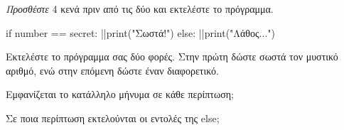 \documentclass[a4paper,11pt,oneside]{book}
\begin{document}
\begin{step}
\emph{Προσθέστε} 4 κενά πριν από τις δύο  και εκτελέστε το πρόγραμμα.

\begin{pyplain}
if number == secret:
|\pyhighlight{\vphantom{λρ}    }|print("Σωστά!")
else:
|\pyhighlight{\vphantom{λρ}    }|print("Λάθος...")
\end{pyplain}

Εκτελέστε το πρόγραμμα σας δύο φορές. Στην πρώτη δώστε σωστά τον μυστικό αριθμό, ενώ στην επόμενη δώστε έναν διαφορετικό.


Εμφανίζεται το κατάλληλο μήνυμα σε κάθε περίπτωση;

\marginnote[14pt]{\icondiscuss}
\dottedline

Σε ποια περίπτωση εκτελούνται οι εντολές της else;

\marginnote[14pt]{\icondiscuss}
\dottedline

\dottedline
\end{step}


\end{document}
